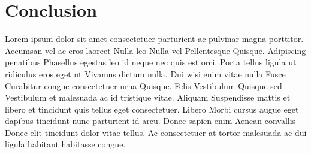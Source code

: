 \chapter{Conclusion} \label{chap:conclusion}
Lorem ipsum dolor sit amet consectetuer parturient ac pulvinar magna porttitor. Accumsan vel ac eros laoreet Nulla leo Nulla vel Pellentesque Quisque. Adipiscing penatibus Phasellus egestas leo id neque nec quis est orci. Porta tellus ligula ut ridiculus eros eget ut Vivamus dictum nulla. Dui wisi enim vitae nulla Fusce Curabitur congue consectetuer urna Quisque. Felis Vestibulum Quisque sed Vestibulum et malesuada ac id tristique vitae. Aliquam Suspendisse mattis et libero et tincidunt quis tellus eget consectetuer. Libero Morbi cursus augue eget dapibus tincidunt nunc parturient id arcu. Donec sapien enim Aenean convallis Donec elit tincidunt dolor vitae tellus. Ac consectetuer at tortor malesuada ac dui ligula habitant habitasse congue. 
